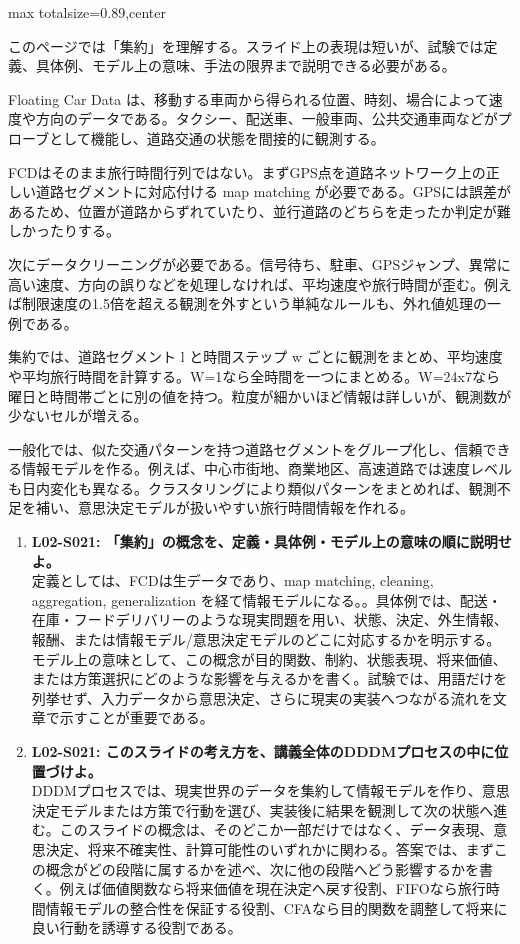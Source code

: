 \begin{minipage}[t]{0.58\textwidth}
\begin{adjustbox}{max totalsize={\textwidth}{0.89\textheight},center}
\begin{minipage}{\textwidth}\scriptsize
{}このページでは「集約」を理解する。スライド上の表現は短いが、試験では定義、具体例、モデル上の意味、手法の限界まで説明できる必要がある。\par
Floating Car Data は、移動する車両から得られる位置、時刻、場合によって速度や方向のデータである。タクシー、配送車、一般車両、公共交通車両などがプローブとして機能し、道路交通の状態を間接的に観測する。\par
FCDはそのまま旅行時間行列ではない。まずGPS点を道路ネットワーク上の正しい道路セグメントに対応付ける map matching が必要である。GPSには誤差があるため、位置が道路からずれていたり、並行道路のどちらを走ったか判定が難しかったりする。\par
次にデータクリーニングが必要である。信号待ち、駐車、GPSジャンプ、異常に高い速度、方向の誤りなどを処理しなければ、平均速度や旅行時間が歪む。例えば制限速度の1.5倍を超える観測を外すという単純なルールも、外れ値処理の一例である。\par
集約では、道路セグメント l と時間ステップ w ごとに観測をまとめ、平均速度や平均旅行時間を計算する。W=1なら全時間を一つにまとめる。W=24x7なら曜日と時間帯ごとに別の値を持つ。粒度が細かいほど情報は詳しいが、観測数が少ないセルが増える。\par
一般化では、似た交通パターンを持つ道路セグメントをグループ化し、信頼できる情報モデルを作る。例えば、中心市街地、商業地区、高速道路では速度レベルも日内変化も異なる。クラスタリングにより類似パターンをまとめれば、観測不足を補い、意思決定モデルが扱いやすい旅行時間情報を作れる。\par{}\begin{enumerate}\item \textbf{L02-S021: 「集約」の概念を、定義・具体例・モデル上の意味の順に説明せよ。}\\定義としては、FCDは生データであり、map matching, cleaning, aggregation, generalization を経て情報モデルになる。。具体例では、配送・在庫・フードデリバリーのような現実問題を用い、状態、決定、外生情報、報酬、または情報モデル/意思決定モデルのどこに対応するかを明示する。モデル上の意味として、この概念が目的関数、制約、状態表現、将来価値、または方策選択にどのような影響を与えるかを書く。試験では、用語だけを列挙せず、入力データから意思決定、さらに現実の実装へつながる流れを文章で示すことが重要である。\item \textbf{L02-S021: このスライドの考え方を、講義全体のDDDMプロセスの中に位置づけよ。}\\DDDMプロセスでは、現実世界のデータを集約して情報モデルを作り、意思決定モデルまたは方策で行動を選び、実装後に結果を観測して次の状態へ進む。このスライドの概念は、そのどこか一部だけではなく、データ表現、意思決定、将来不確実性、計算可能性のいずれかに関わる。答案では、まずこの概念がどの段階に属するかを述べ、次に他の段階へどう影響するかを書く。例えば価値関数なら将来価値を現在決定へ戻す役割、FIFOなら旅行時間情報モデルの整合性を保証する役割、CFAなら目的関数を調整して将来に良い行動を誘導する役割である。\end{enumerate}

\end{minipage}
\end{adjustbox}
\end{minipage}
